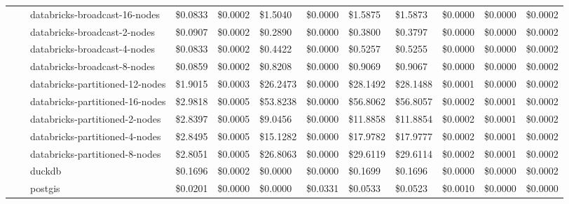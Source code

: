 \begin{tabular}{llllllllllll}
 &  & databricks-broadcast-16-nodes & \$0.0833 & \$0.0002 & \$1.5040 & \$0.0000 & \$1.5875 & \$1.5873 & \$0.0000 & \$0.0000 & \$0.0002 \\
 &  & databricks-broadcast-2-nodes & \$0.0907 & \$0.0002 & \$0.2890 & \$0.0000 & \$0.3800 & \$0.3797 & \$0.0000 & \$0.0000 & \$0.0002 \\
 &  & databricks-broadcast-4-nodes & \$0.0833 & \$0.0002 & \$0.4422 & \$0.0000 & \$0.5257 & \$0.5255 & \$0.0000 & \$0.0000 & \$0.0002 \\
 &  & databricks-broadcast-8-nodes & \$0.0859 & \$0.0002 & \$0.8208 & \$0.0000 & \$0.9069 & \$0.9067 & \$0.0000 & \$0.0000 & \$0.0002 \\
 &  & databricks-partitioned-12-nodes & \$1.9015 & \$0.0003 & \$26.2473 & \$0.0000 & \$28.1492 & \$28.1488 & \$0.0001 & \$0.0000 & \$0.0002 \\
 &  & databricks-partitioned-16-nodes & \$2.9818 & \$0.0005 & \$53.8238 & \$0.0000 & \$56.8062 & \$56.8057 & \$0.0002 & \$0.0001 & \$0.0002 \\
 &  & databricks-partitioned-2-nodes & \$2.8397 & \$0.0005 & \$9.0456 & \$0.0000 & \$11.8858 & \$11.8854 & \$0.0002 & \$0.0001 & \$0.0002 \\
 &  & databricks-partitioned-4-nodes & \$2.8495 & \$0.0005 & \$15.1282 & \$0.0000 & \$17.9782 & \$17.9777 & \$0.0002 & \$0.0001 & \$0.0002 \\
 &  & databricks-partitioned-8-nodes & \$2.8051 & \$0.0005 & \$26.8063 & \$0.0000 & \$29.6119 & \$29.6114 & \$0.0002 & \$0.0001 & \$0.0002 \\
 &  & duckdb & \$0.1696 & \$0.0002 & \$0.0000 & \$0.0000 & \$0.1699 & \$0.1696 & \$0.0000 & \$0.0000 & \$0.0002 \\
 &  & postgis & \$0.0201 & \$0.0000 & \$0.0000 & \$0.0331 & \$0.0533 & \$0.0523 & \$0.0010 & \$0.0000 & \$0.0000 \\
\cline{1-12} \cline{2-12}
\bottomrule
\end{tabular}
